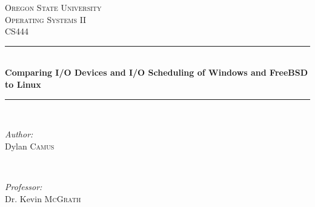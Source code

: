 \documentclass[journal,letterpaper,draftclsnofoot,onecolumn,10pt]{IEEEtran}
\begin{document}
\begin{titlepage}

\newcommand{\HRule}{\rule{\linewidth}{0.5mm}} %

\center %
 

\textsc{\LARGE Oregon State University}\\[1.5cm] %
\textsc{\Large Operating Systems II}\\[0.5cm] %
\textsc{\large CS444}\\[0.5cm] %


\HRule \\[0.4cm]
{ \huge \bfseries Comparing I/O Devices and I/O Scheduling of Windows and FreeBSD to Linux}\\[0.4cm] %
\HRule \\[1.5cm]
 

\begin{minipage}{0.4\textwidth}
   \begin{flushleft} \large
      \emph{Author:}\\
      Dylan \textsc{Camus} %
   \end{flushleft}
\end{minipage}
~
\begin{minipage}{0.4\textwidth}
   \begin{flushright} \large
      \emph{Professor:} \\
      Dr. Kevin \textsc{McGrath} %
   \end{flushright}
\end{minipage}\\[4cm]



\end{titlepage}
\end{document}
